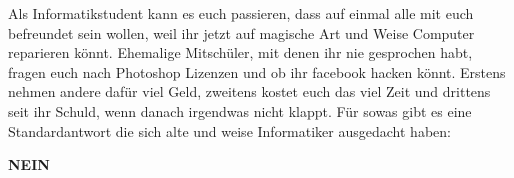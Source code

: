 Als Informatikstudent kann es euch passieren, dass auf einmal alle mit euch
befreundet sein wollen, weil ihr jetzt auf magische Art und Weise Computer
reparieren k\"onnt. Ehemalige Mitsch\"uler, mit denen ihr nie gesprochen habt,
fragen euch nach Photoshop Lizenzen und ob ihr facebook hacken
k\"onnt. Erstens nehmen andere daf\"ur viel Geld, zweitens kostet euch das viel
Zeit und drittens seit ihr Schuld, wenn danach irgendwas nicht klappt. F\"ur
sowas gibt es eine Standardantwort die sich alte und weise Informatiker
ausgedacht haben:
\begin{center}\textbf{\Huge NEIN}\end{center}


